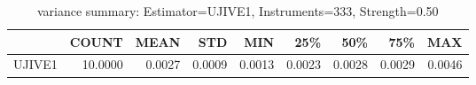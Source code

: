 \begin{table}[ht]
\centering
\caption{variance summary: Estimator=UJIVE1, Instruments=333, Strength=0.50}
\begin{tabular}{lrrrrrrrr}
\toprule
 & COUNT & MEAN & STD & MIN & 25\% & 50\% & 75\% & MAX \\
\midrule
UJIVE1 & 10.0000 & 0.0027 & 0.0009 & 0.0013 & 0.0023 & 0.0028 & 0.0029 & 0.0046 \\
\bottomrule
\end{tabular}
\end{table}
